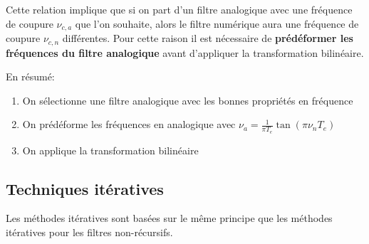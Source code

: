 \documentclass[11pt,a4paper]{article}
\begin{document}
Cette relation implique que si on part d'un filtre analogique avec une fréquence de coupure $\nu_{c,a}$ que l'on souhaite, alors le filtre numérique aura une fréquence de coupure $\nu_{c,n}$ différentes. Pour cette raison il est nécessaire de \textbf{prédéformer les fréquences du filtre analogique} avant d'appliquer la transformation bilinéaire.

En résumé:
\begin{center}
\end{center}
\begin{enumerate}
\item On sélectionne une filtre analogique avec les bonnes propriétés en fréquence 
\item On prédéforme les fréquences en analogique avec $\nu_a = \frac{1}{ \pi T_e} \tan(\pi \nu_n T_e)$
\item On applique la transformation bilinéaire
\end{enumerate}


\subsection{Techniques itératives}
Les méthodes itératives sont basées sur le même principe que les méthodes itératives pour les filtres non-récursifs.
\end{document}
